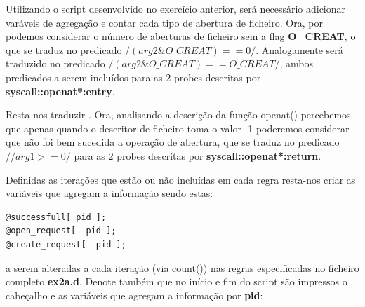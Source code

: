 \documentclass[a4paper]{article}
\begin{document}
Utilizando o script desenvolvido no exercício anterior, será necessário adicionar varáveis de agregação e contar cada tipo de abertura de ficheiro. Ora, por \textbf{} podemos considerar o número de aberturas de ficheiro sem a flag \textbf{O\_CREAT}, o que se traduz no predicado $/( arg2  \&  O\_CREAT) == 0 /$. Analogamente \textbf{} será traduzido no predicado $/ ( arg2  \&  O\_CREAT ) == O\_CREAT /$, ambos predicados a serem incluídos para as 2 probes descritas por \textbf{syscall::openat*:entry}.\par 
Resta-nos  traduzir \textbf{}. Ora, analisando a descrição da função openat() percebemos que apenas quando o descritor de ficheiro toma o valor -1 poderemos considerar que não foi bem sucedida a operação de abertura, que se traduz no predicado $//arg1 >= 0/$ para as 2 probes descritas por \textbf{syscall::openat*:return}.\par Definidas as iterações que estão ou não incluídas em cada regra resta-nos criar as variáveis que agregam a informação sendo estas:
\begin{lstlisting}
@successfull[ pid ];
@open_request[  pid ];
@create_request[  pid ];
\end{lstlisting}
a serem alteradas a cada iteração (via count()) nas regras especificadas no ficheiro completo \textbf{ex2a.d}. Denote também que no início e fim do script são impressos o cabeçalho e as variáveis  que agregam a informação por \textbf{pid}:
\end{document}

